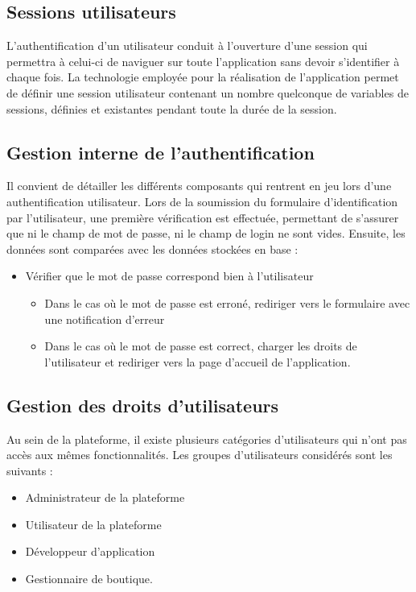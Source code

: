 \documentclass[a4paper,12pt]{report}
\begin{document}
\begin{onehalfspace}
\subsection{Sessions utilisateurs}
L’authentification d’un utilisateur conduit à l’ouverture d’une session qui permettra à celui-ci de naviguer sur toute l'application sans devoir s’identifier à chaque fois. La technologie employée pour la réalisation de l'application permet de définir une session utilisateur contenant un nombre quelconque de variables de sessions, définies et existantes pendant toute la durée de la session.

\subsection{Gestion interne de l’authentification}
Il convient de détailler les différents composants qui rentrent en jeu lors d’une authentification utilisateur. Lors de la soumission du formulaire d’identification par l’utilisateur, une première vérification est effectuée, permettant de s’assurer que ni le champ de mot de passe, ni le champ de login ne sont vides. Ensuite, les données sont comparées avec les données stockées en base :
\begin{itemize}
  \item Vérifier que le mot de passe correspond bien à l’utilisateur
  \begin{itemize}
    \item Dans le cas où le mot de passe est erroné, rediriger vers le formulaire avec une notification d’erreur
    \item Dans le cas où le mot de passe est correct, charger les droits de l’utilisateur et rediriger vers la page d’accueil de l’application.
  \end{itemize}
\end{itemize}

\subsection{Gestion des droits d’utilisateurs}
Au sein de la plateforme, il existe plusieurs catégories d’utilisateurs qui n’ont pas accès aux mêmes fonctionnalités. Les groupes d’utilisateurs considérés sont les suivants :
\begin{itemize}
  \item Administrateur de la plateforme
  \item Utilisateur de la plateforme
  \item Développeur d'application
  \item Gestionnaire de boutique.
\end{itemize}

  \end{onehalfspace}
\end{document}
